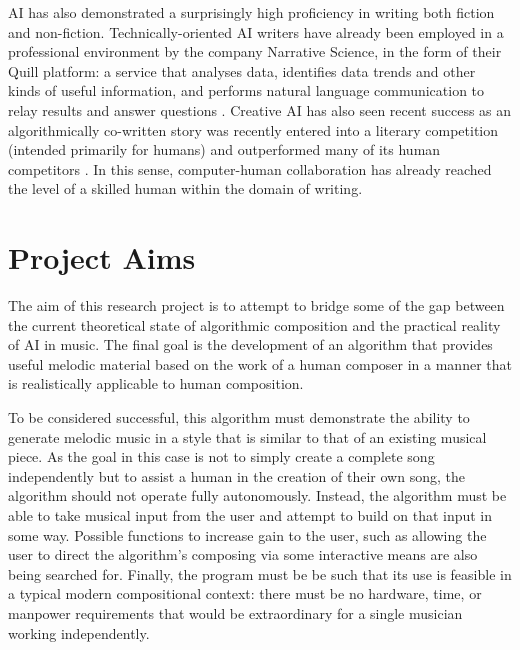 \documentclass[ author={Stephen Livermore-Tozer},
				supervisor={Dr. Peter Flach},
				degree={MEng},
				title={Algorithmic Co-composition Using Machine Learning},
				subtitle={},
				type={research},
				year={2016} ]{dissertation}
\begin{document}
	AI has also demonstrated a surprisingly high proficiency in writing both fiction and non-fiction. Technically-oriented AI writers have already been employed in a professional environment by the company Narrative Science, in the form of their Quill platform: a service that analyses data, identifies data trends and other kinds of useful information, and performs natural language communication to relay results and answer questions \cite{woodie2016big}. Creative AI has also seen recent success as an algorithmically co-written story was recently entered into a literary competition (intended primarily for humans) and outperformed many of its human competitors \cite{tarantola2016ai}. In this sense, computer-human collaboration has already reached the level of a skilled human within the domain of writing. 
	
	\section{Project Aims}
	\label{sec:project-aims}
	
	The aim of this research project is to attempt to bridge some of the gap between the current theoretical state of algorithmic composition and the practical reality of AI in music. The final goal is the development of an algorithm that provides useful melodic material based on the work of a human composer in a manner that is realistically applicable to human composition.
	
	To be considered successful, this algorithm must demonstrate the ability to generate melodic music in a style that is similar to that of an existing musical piece. As the goal in this case is not to simply create a complete song independently but to assist a human in the creation of their own song, the algorithm should not operate fully autonomously. Instead, the algorithm must be able to take musical input from the user and attempt to build on that input in some way. Possible functions to increase gain to the user, such as allowing the user to direct the algorithm's composing via some interactive means are also being searched for. Finally, the program must be be such that its use is feasible in a typical modern compositional context: there must be no hardware, time, or manpower requirements that would be extraordinary for a single musician working independently.
	
\end{document}

